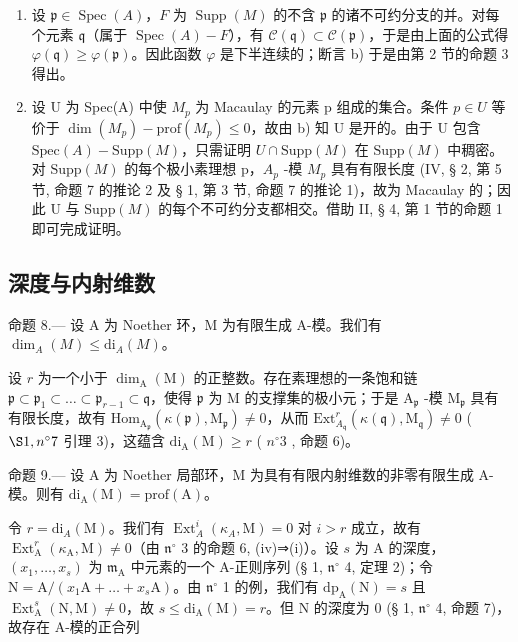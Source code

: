 \begin{enumerate}
\def\labelenumi{\alph{enumi})}
\setcounter{enumi}{1}
\item
  设 \(\mathfrak{p} \in \operatorname{Spec}(A)\)，\(F\) 为 \(\operatorname{Supp}(M)\) 的不含 \(\mathfrak{p}\) 的诸不可约分支的并。对每个元素 \(\mathfrak{q}\)（属于 \(\operatorname{Spec}(A) - F\)），有 \(\mathcal{C}(\mathfrak{q}) \subset \mathcal{C}(\mathfrak{p})\)，于是由上面的公式得 \(\varphi(\mathfrak{q}) \geqslant \varphi(\mathfrak{p})\)。因此函数 \(\varphi\) 是下半连续的；断言 b) 于是由第 2 节的命题 3 得出。
\item
  设 U 为 Spec(A) 中使 \(M_{p}\) 为 Macaulay 的元素 p 组成的集合。条件 \(p \in U\) 等价于 \(\dim(M_{p}) - \text{prof}(M_{p}) \leqslant 0\)，故由 b) 知 U 是开的。由于 U 包含 \(\text{Spec}(A) - \text{Supp}(M)\)，只需证明 \(U \cap \text{Supp}(M)\) 在 \(\text{Supp}(M)\) 中稠密。对 \(\text{Supp}(M)\) 的每个极小素理想 p，\(A_{p}\) -模 \(M_{p}\) 具有有限长度 (IV, § 2, 第 5 节, 命题 7 的推论 2 及 § 1, 第 3 节, 命题 7 的推论 1)，故为 Macaulay 的；因此 U 与 \(\text{Supp}(M)\) 的每个不可约分支都相交。借助 II, § 4, 第 1 节的命题 1 即可完成证明。
\end{enumerate}

\subsection{深度与内射维数}

命题 8.--- 设 A 为 Noether 环，M 为有限生成 A-模。我们有 \(\dim_{A}(M) \leqslant \mathrm{di}_{A}(M)\)。

设 \(r\) 为一个小于 \(\dim_{\mathrm{A}}(\mathrm{M})\) 的正整数。存在素理想的一条饱和链 \(\mathfrak{p} \subset \mathfrak{p}_{1} \subset \ldots \subset \mathfrak{p}_{r-1} \subset \mathfrak{q}\)，使得 \(\mathfrak{p}\) 为 M 的支撑集的极小元；于是 \(\mathrm{A}_{\mathfrak{p}}\) -模 \(\mathrm{M}_{\mathfrak{p}}\) 具有有限长度，故有 \(\mathrm{Hom}_{\mathrm{A}_{\mathfrak{p}}}(\kappa(\mathfrak{p}), \mathrm{M}_{\mathfrak{p}}) \neq 0\)，从而 \(\mathrm{Ext}_{A_{\mathfrak{q}}}^{r}(\kappa(\mathfrak{q}), \mathrm{M}_{\mathfrak{q}}) \neq 0\) ( \(\S 1, n^{\circ} 7\) 引理 3)，这蕴含 \(\mathrm{di}_{\mathrm{A}}(\mathrm{M}) \geqslant r\) ( \(n^{\circ} 3\) , 命题 6)。

命题 9.--- 设 A 为 Noether 局部环，M 为具有有限内射维数的非零有限生成 A-模。则有 \(\mathrm{di}_{\mathrm{A}}(\mathrm{M}) = \mathrm{prof}(\mathrm{A})\)。

令 \(r = \mathrm{di}_{A}(\mathrm{M})\)。我们有 \(\operatorname{Ext}_{A}^{i}(\kappa_{A}, \mathrm{M}) = 0\) 对 \(i > r\) 成立，故有 \(\operatorname{Ext}_{\mathrm{A}}^{r}(\kappa_{\mathrm{A}}, \mathrm{M}) \neq 0\)（由 \(\mathfrak{n}^{\circ}\) 3 的命题 6, (iv)⇒(i)）。设 \(s\) 为 A 的深度，\((x_1, \ldots, x_s)\) 为 \(\mathfrak{m}_{\mathrm{A}}\) 中元素的一个 A-正则序列 (§ 1, \(\mathfrak{n}^{\circ}\) 4, 定理 2)；令 \(\mathrm{N} = \mathrm{A}/(x_1\mathrm{A} + \ldots + x_s\mathrm{A})\)。由 \(\mathfrak{n}^{\circ}\) 1 的例，我们有 \(\mathrm{dp}_{\mathrm{A}}(\mathrm{N}) = s\) 且 \(\operatorname{Ext}_{\mathrm{A}}^{s}(\mathrm{N}, \mathrm{M}) \neq 0\)，故 \(s \leqslant \mathrm{di}_{\mathrm{A}}(\mathrm{M}) = r\)。但 N 的深度为 0 (§ 1, \(\mathfrak{n}^{\circ}\) 4, 命题 7)，故存在 A-模的正合列

